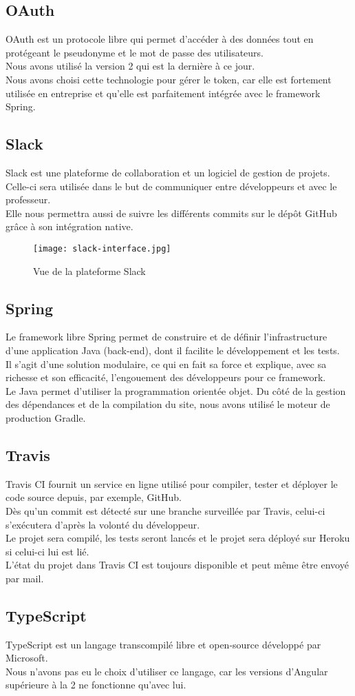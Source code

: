 	\subsection{OAuth}
	OAuth est un protocole libre qui permet d'accéder à des données tout en protégeant le pseudonyme et le mot de passe des utilisateurs. \\
	Nous avons utilisé la version 2 qui est la dernière à ce jour\cite{oauth2}\cite{wikipedia-oauth}. \\
	Nous avons choisi cette technologie pour gérer le token, car elle est fortement utilisée en entreprise et qu'elle est parfaitement intégrée avec le framework Spring.
	
	\subsection{Slack}
	Slack est une plateforme de collaboration et un logiciel de gestion de projets. \\
	Celle-ci sera utilisée dans le but de communiquer entre développeurs et avec le professeur. \\
	Elle nous permettra aussi de suivre les différents commits sur le dépôt GitHub grâce à son intégration native.
	
	\begin{figure}[ht]
		\centering
		\texttt{[image: slack-interface.jpg]}
		\caption{Vue de la plateforme Slack}
	\end{figure}
	
	\subsection{Spring}
	Le framework libre Spring permet de construire et de définir l'infrastructure d'une application Java (back-end), dont il facilite le développement et les tests. \\
	Il s'agit d'une solution modulaire, ce qui en fait sa force et explique, avec sa richesse et son efficacité, l'engouement des développeurs pour ce framework. \\
	Le Java permet d'utiliser la programmation orientée objet.
	Du côté de la gestion des dépendances et de la compilation du site, nous avons utilisé le moteur de production Gradle.
	
	\subsection{Travis}
	Travis CI fournit un service en ligne utilisé pour compiler, tester et déployer le code source depuis, par exemple, GitHub. \\
	Dès qu'un commit est détecté sur une branche surveillée par Travis, celui-ci s'exécutera d'après la volonté du développeur. \\
	Le projet sera compilé, les tests seront lancés et le projet sera déployé sur Heroku si celui-ci lui est lié. \\
	L'état du projet dans Travis CI est toujours disponible et peut même être envoyé par mail.
	
	\subsection{TypeScript}
	TypeScript est un langage transcompilé libre et open-source développé par Microsoft. \\
	Nous n'avons pas eu le choix d'utiliser ce langage, car les versions d'Angular supérieure à la 2 ne fonctionne qu'avec lui.